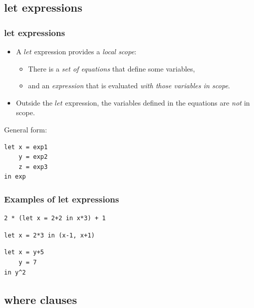 \documentclass{beamer}
\begin{document}
\subsection{let expressions}

\begin{frame}[fragile]
\frametitle{let expressions}

\begin{itemize}
\item A $let$ expression provides a \emph{local scope}:
  \begin{itemize}
  \item There is a \emph{set of equations} that define some
    variables,
  \item and an \emph{expression} that is evaluated \emph{with those
      variables in scope}.
  \end{itemize}
\item Outside the $let$ expression, the variables defined in the
  equations are \emph{not} in scope.
\end{itemize}

General form:

\begin{verbatim}
let x = exp1
    y = exp2
    z = exp3
in exp
\end{verbatim}

\end{frame}

\begin{frame}[fragile]
\frametitle{Examples of let expressions}

\begin{verbatim}
2 * (let x = 2+2 in x*3) + 1
\end{verbatim}

\begin{verbatim}
let x = 2*3 in (x-1, x+1)
\end{verbatim}

\begin{verbatim}
let x = y+5
    y = 7
in y^2
\end{verbatim}

\end{frame}

\subsection{where clauses}
\end{document}
